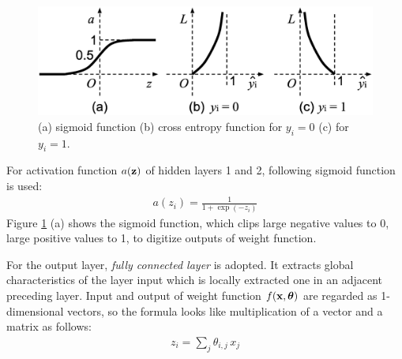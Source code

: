 \documentclass[twocolumn]{article}
\begin{document}
\begin{figure}[!tb]
 \begin{center}
  \begin{minipage}{\hsize}
   \includegraphics[width=\hsize]{fig/curves_03.eps}
   \caption{(a) sigmoid function
    (b) cross entropy function for $y_i = 0$ (c) for $y_i = 1$.}
   \label{fig:curves}
  \end{minipage}
 \end{center}
\end{figure}

For activation function $a({\bf z})$ of hidden layers 1 and 2,
following sigmoid function is used:
\begin{eqnarray}
a(z_i) = \frac{1}{1+\exp(-z_i)}
\end{eqnarray}
Figure \ref{fig:curves} (a) shows the sigmoid function,
which clips large negative values to 0, large positive values to 1,
to digitize outputs of weight function.

For the output layer, {\it fully connected layer} is adopted.
It extracts global characteristics of the layer input
which is locally extracted one in an adjacent preceding layer.
Input and output of weight function 
$f({\bf x}, {\bm \theta})$
are regarded as 1-dimensional vectors,
so the formula looks like multiplication of a vector and a matrix as follows:
\begin{eqnarray}
z_i = \sum_{j} \theta_{i,j}\, x_{j}
\end{eqnarray}
\end{document}
